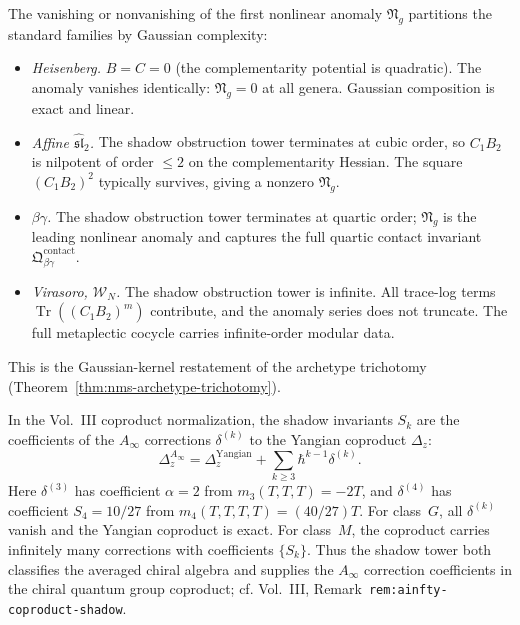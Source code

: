\begin{remark}
\label{rem:holo-comp-archetype-connection}
The vanishing or nonvanishing of the first nonlinear anomaly
$\mathfrak{N}_g$ partitions the standard families by Gaussian
complexity:
\begin{itemize}
\item \emph{Heisenberg.}\;
 $B = C = 0$ (the complementarity potential is quadratic).
 The anomaly vanishes identically: $\mathfrak{N}_g = 0$ at all
 genera. Gaussian composition is exact and linear.
\item \emph{Affine $\widehat{\mathfrak{sl}}_2$.}\;
 The shadow obstruction tower terminates at cubic order, so $C_1 B_2$ is
 nilpotent of order $\leq 2$ on the complementarity Hessian.
 The square $(C_1 B_2)^2$ typically survives, giving a nonzero
 $\mathfrak{N}_g$.
\item \emph{$\beta\gamma$.}\;
 The shadow obstruction tower terminates at quartic order; $\mathfrak{N}_g$ is
 the leading nonlinear anomaly and captures the full quartic
 contact invariant $\mathfrak{Q}^{\mathrm{contact}}_{\beta\gamma}$.
\item \emph{Virasoro, $\mathcal{W}_N$.}\;
 The shadow obstruction tower is infinite. All trace-log terms
 $\operatorname{Tr}((C_1 B_2)^m)$ contribute, and the anomaly
 series does not truncate. The full metaplectic cocycle carries
 infinite-order modular data.
\end{itemize}
This is the Gaussian-kernel restatement of the archetype trichotomy
(Theorem~\ref{thm:nms-archetype-trichotomy}).
\end{remark}

\begin{remark}
\label{rem:shadow-ainfty-coproduct-vol3}
In the Vol.~III coproduct normalization, the shadow invariants $S_k$ are
the coefficients of the $A_\infty$ corrections $\delta^{(k)}$ to the
Yangian coproduct $\Delta_z$:
\[
 \Delta_z^{A_\infty}
 =
 \Delta_z^{\mathrm{Yangian}}
 + \sum_{k \geq 3} \hbar^{k-1}\delta^{(k)}.
\]
Here $\delta^{(3)}$ has coefficient $\alpha=2$ from
$m_3(T,T,T)=-2T$, and $\delta^{(4)}$ has coefficient $S_4=10/27$
from $m_4(T,T,T,T)=(40/27)T$. For class~$G$, all
$\delta^{(k)}$ vanish and the Yangian coproduct is exact. For
class~$M$, the coproduct carries infinitely many corrections with
coefficients $\{S_k\}$. Thus the shadow tower both classifies the
averaged chiral algebra and supplies the $A_\infty$ correction
coefficients in the chiral quantum group coproduct; cf. Vol.~III,
Remark~\texttt{rem:ainfty-coproduct-shadow}.
\end{remark}

